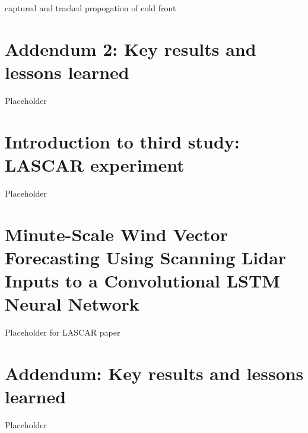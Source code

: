 captured and tracked propogation of cold front






\clearpage
\section{Addendum 2: Key results and lessons learned}
\label{sec:balcony_addendum2}

Placeholder


\clearpage
\section{Introduction to third study: LASCAR experiment}
\label{sec:lascar_intro}

Placeholder


\clearpage
\section{Minute-Scale Wind Vector Forecasting Using Scanning Lidar Inputs to a Convolutional LSTM Neural Network}
\label{sec:lascar_paper}

Placeholder for LASCAR paper
%

\clearpage
\section{Addendum: Key results and lessons learned}
\label{sec:lascar_addendum}

Placeholder